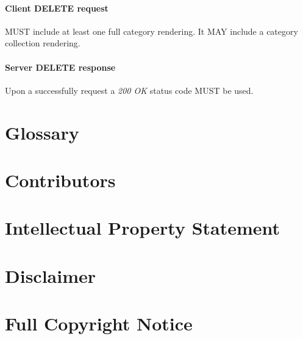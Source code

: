 \documentclass[10pt,a4paper]{article}
\begin{document}
\paragraph{Client DELETE request}
MUST include at least one full category rendering. It MAY include a category collection rendering.

\paragraph{Server DELETE response}
Upon a successfully request a \emph{200 OK} status code MUST be used.

\section{Glossary}
\label{sec:glossary}


\section{Contributors}


\section{Intellectual Property Statement}


\section{Disclaimer}


\section{Full Copyright Notice}




\end{document}
